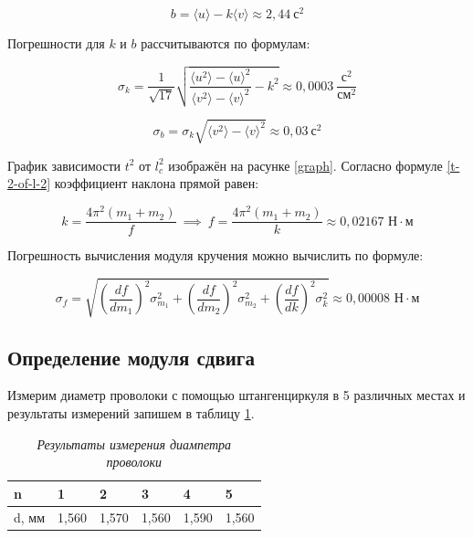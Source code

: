 \documentclass[a4paper,12pt]{article}
\begin{document}
\begin{equation}
    b = \langle u \rangle - k\langle v \rangle \approx 2,44 \ \text{с}^2
\end{equation}

Погрешности для $k$ и $b$ рассчитываются по формулам:

\begin{equation}
    \sigma_k = \frac{1}{\sqrt{17}} \sqrt{\frac{\langle u^2 \rangle - \langle u \rangle^2}{\langle v^2 \rangle - \langle v \rangle^2} - k^2} \approx 0,0003 \ \frac{\text{с}^2}{\text{см}^2}
\end{equation}

\begin{equation}
    \sigma_b = \sigma_k\sqrt{\langle v^2 \rangle - \langle v \rangle^2} \approx 0,03 \ \text{с}^2
\end{equation}

График зависимости $t^2$ от $l_c^2$ изображён на расунке \ref{graph}. Согласно формуле \eqref{t-2-of-l-2} коэффициент наклона прямой равен:

\begin{equation}
    k = \frac{4 \pi^2 (m_1 + m_2)}{f} \ \implies \ f = \frac{4 \pi^2 (m_1 + m_2)}{k} \approx 0,02167 \text{ Н} \cdot \text{м}
\end{equation}

Погрешность вычисления модуля кручения можно вычислить по формуле:

\begin{equation}
    \sigma_f = \sqrt{
    \left( \frac{df}{dm_1} \right)^2 \sigma_{m_1}^2 +
    \left( \frac{df}{dm_2} \right)^2 \sigma_{m_2}^2 +
    \left( \frac{df}{dk} \right)^2 \sigma_{k}^2
    } \approx 0,00008 \text{ Н} \cdot \text{м}
\end{equation}

\subsection{Определение модуля сдвига}

Измерим диаметр проволоки с помощью штангенциркуля в 5 различных местах и результаты измерений запишем в таблицу \ref{diameter}.

\begin{table}[!ht]
    \centering
    \begin{tabular}{|l|l|l|l|l|l|}
    \hline
        n & 1 & 2 & 3 & 4 & 5 \\ \hline
        d, мм & 1,560 & 1,570 & 1,560 & 1,590 & 1,560 \\ \hline
    \end{tabular}\caption{\textit{Результаты измерения диампетра проволоки}}\label{diameter}
\end{table}
\end{document}
